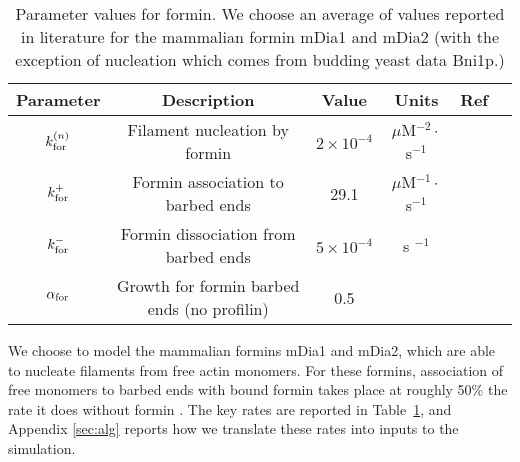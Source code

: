 \documentclass[11pt]{article}
\begin{document}
\begin{table}
\begin{center}
\begin{tabular}{|c|c|c|c|c|c|}\hline
Parameter & Description & Value & Units & Ref  \\ \hline
$k_\text{for}^{(n)}$ & Filament nucleation by formin & $2 \times 10^{-4}$ & $\mu$M$^{-2}\cdot$s$^{-1}$& \cite[Tab.~S1]{paul2008role}  \\ 
$k_\text{for}^+$ & Formin association to barbed ends& 29.1 & $\mu$M$^{-1} \cdot $s$^{-1}$ & \cite{shekhar2015formin} \\
$k_\text{for}^-$ & Formin dissociation from barbed ends& $5 \times 10^{-4}$ & s $^{-1}$ & \cite{kovar2006control}\\
$\alpha_\text{for}$ &Growth for formin barbed ends (no profilin) & 0.5 & & \cite{kovar2006control}\\ \hline
\end{tabular}
\caption{\label{tab:paramsF} Parameter values for formin. We choose an average of values reported in literature for the mammalian formin mDia1 and mDia2 (with the exception of nucleation which comes from budding yeast data Bni1p.)}
\end{center}
\end{table}

We choose to model the mammalian formins mDia1 and mDia2, which are able to nucleate filaments from free actin monomers. For these formins, association of free monomers to barbed ends with bound formin takes place at roughly 50\% the rate it does without formin \cite{kovar2006control}. The key rates are reported in Table\ \ref{tab:paramsF}, and Appendix \ref{sec:alg} reports how we translate these rates into inputs to the simulation. 
\end{document}
